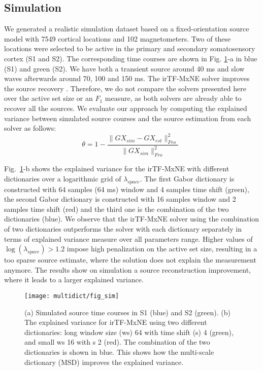 \subsection{Simulation}
We generated a realistic simulation dataset based on a fixed-orientation source model with 7549 cortical locations and 102 magnetometers. Two of these locations were selected to be active in the primary and secondary somatosensory cortex (S1 and S2). The corresponding time courses are shown in Fig. \ref{fig:simulation}-a in blue (S1) and green (S2). We have both a transient source around 40 ms and slow waves afterwards around 70, 100 and 150 ms. The irTF-MxNE solver improves the source recovery \cite{daniel15}. Therefore, we do not compare the solvers presented here over the active set size or an $F_1$ measure, %
as both solvers are already able to recover all the sources. %
We evaluate our approach by computing  %
the explained variance between simulated source courses and the source estimation from each solver as follows:
\begin{equation}
	\theta = 1 - \frac{\|GX_{sim}-GX_{est}\|^2_{Fro}}{\|GX_{sim}\|^2_{Fro}} \enspace
\end{equation}

Fig.~\ref{fig:simulation}-b shows the explained variance for the irTF-MxNE with different dictionaries over a logarithmic grid of $\lambda_{space}$. The first Gabor dictionary is constructed with 64 samples (64 ms) window and 4 samples time shift (green), the second Gabor dictionary is constructed with 16 samples window and 2 samples time shift (red) and the third one is the combination of the two dictionaries (blue). We observe that the irTF-MxNE solver using the combination of two dictionaries outperforms the solver with each dictionary separately in terms of explained variance measure over all parameters range. Higher values of $\log(\lambda_{space})>1.2$ impose high penalization on the active set size, resulting in a too sparse source estimate, where the solution does not explain the measurement anymore. The results show on simulation a source reconstruction improvement, where it leads to a larger explained variance.

\begin{figure}
\centering
	\texttt{[image: multidict/fig\_sim]}
    \caption{(a) Simulated source time courses in S1 (blue) and S2 (green). (b) The explained variance for irTF-MxNE using two different dictionaries: long window size (ws) 64 with time shift (s) 4 (green), and small ws 16 with s 2 (red). The combination of the two dictionaries is shown in blue. This shows how the multi-scale dictionary (MSD) improves the explained variance.}
    \label{fig:simulation}
\end{figure}

